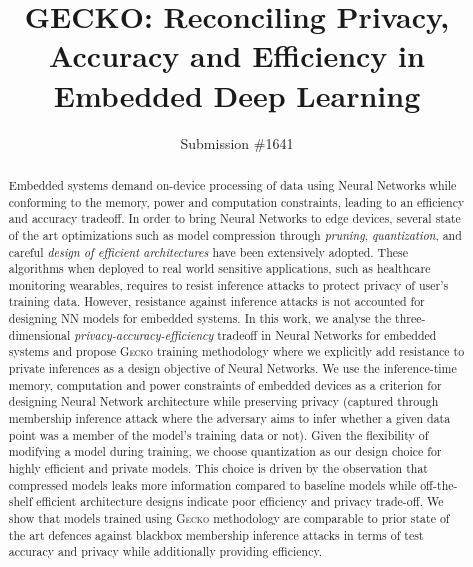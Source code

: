 \documentclass[sigconf]{acmart}
\newcommand{\method}{{\scshape Gecko}}
\begin{document}
\title{GECKO: Reconciling Privacy, Accuracy and Efficiency in Embedded Deep Learning}

\author{Submission \#1641}
\newcommand{\red}[1]{\textcolor{red}{#1}}
\newcommand{\green}[1]{\textcolor{olive}{#1}}
\newcommand{\blue}[1]{\textcolor{blue}{#1}}
\newcommand{\virat}[1]{\blue{Virat:{\bf #1}}}

\begin{abstract}
Embedded systems demand on-device processing of data using Neural Networks while conforming to the memory, power and computation constraints, leading to an efficiency and accuracy tradeoff.
In order to bring Neural Networks to edge devices, several state of the art optimizations such as model compression through \textit{pruning}, \textit{quantization}, and careful \textit{design of efficient architectures} have been extensively adopted. 
These algorithms when deployed to real world sensitive applications, such as healthcare monitoring wearables, requires to resist inference attacks to protect privacy of user's training data. However, resistance against inference attacks is not accounted for designing NN models for embedded systems.
In this work, we analyse the three-dimensional \textit{privacy-accuracy-efficiency} tradeoff in Neural Networks for embedded systems and propose \method\hspace{0.02in} training methodology where we explicitly add resistance to private inferences as a design objective of Neural Networks.
We use the inference-time memory, computation and power constraints of embedded devices as a criterion for designing Neural Network architecture while preserving privacy (captured through membership inference attack where the adversary aims to infer whether a given data point was a member of the model's training data or not).
Given the flexibility of modifying a model during training, we choose quantization as our design choice for highly efficient and private models.
This choice is driven by the observation that compressed models leaks more information compared to baseline models while off-the-shelf efficient architecture designs indicate poor efficiency and privacy trade-off.
We show that models trained using \method\hspace{0.02in} methodology are comparable to prior state of the art defences against blackbox membership inference attacks in terms of test accuracy and privacy while additionally providing efficiency.


\end{abstract}
\end{document}

